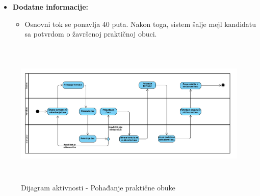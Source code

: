\begin{itemize}
\item \textbf{Dodatne informacije:}    
\begin{itemize}
\item Osnovni tok se ponavlja 40 puta. Nakon toga, sistem šalje mejl kandidatu sa potvrdom o žavršenoj praktičnoj obuci.
\end{itemize}

\end{itemize}

\begin{figure}[H]
  \begin{center}
      \includegraphics[width=140mm, height=70mm]{Diagrams/dijagram_aktivnosti_pohadjanje_prakticne_obuke.png}
  \end{center}
  \caption {Dijagram aktivnosti - Pohađanje praktične obuke}
  \label{activity_pohadjanje_prakticne_obuke}

\end{figure}
